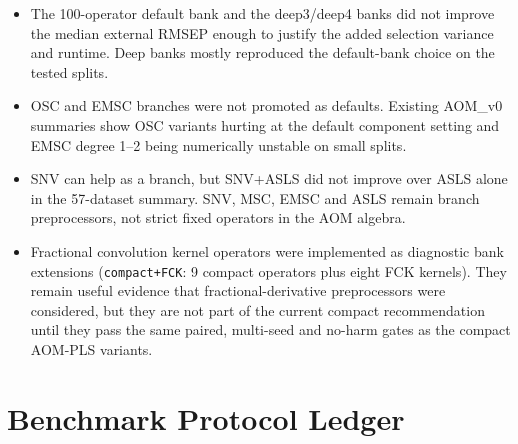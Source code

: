\documentclass[11pt,a4paper]{article}
\newcommand{\code}[1]{\nolinkurl{#1}}
\begin{document}
\begin{itemize}
  \item The 100-operator default bank and the deep3/deep4 banks did not improve
  the median external RMSEP enough to justify the added selection variance and
  runtime.  Deep banks mostly reproduced the default-bank choice on the tested
  splits.
  \item OSC and EMSC branches were not promoted as defaults.  Existing
  AOM\_v0 summaries show OSC variants hurting at the default
  component setting and EMSC degree 1--2 being numerically unstable on small
  splits.
  \item SNV can help as a branch, but SNV+ASLS did not improve over ASLS alone
  in the 57-dataset summary.  SNV, MSC, EMSC and ASLS remain branch
  preprocessors, not strict fixed operators in the AOM algebra.
  \item Fractional convolution kernel operators were implemented as diagnostic
  bank extensions (\code{compact+FCK}: 9 compact operators plus eight FCK
  kernels).  They remain useful evidence that fractional-derivative
  preprocessors were considered, but they are not part of the current compact
  recommendation until they pass the same paired, multi-seed and no-harm gates
  as the compact AOM-PLS variants.
\end{itemize}

\section{Benchmark Protocol Ledger}
\end{document}
